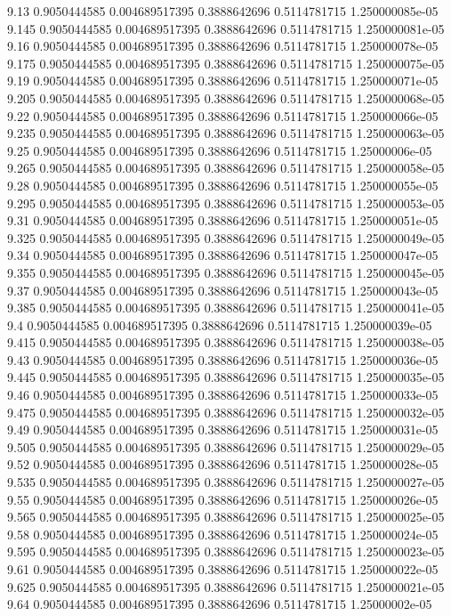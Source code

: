 {9.13 0.9050444585 0.004689517395 0.3888642696 0.5114781715 1.250000085e-05
9.145 0.9050444585 0.004689517395 0.3888642696 0.5114781715 1.250000081e-05
9.16 0.9050444585 0.004689517395 0.3888642696 0.5114781715 1.250000078e-05
9.175 0.9050444585 0.004689517395 0.3888642696 0.5114781715 1.250000075e-05
9.19 0.9050444585 0.004689517395 0.3888642696 0.5114781715 1.250000071e-05
9.205 0.9050444585 0.004689517395 0.3888642696 0.5114781715 1.250000068e-05
9.22 0.9050444585 0.004689517395 0.3888642696 0.5114781715 1.250000066e-05
9.235 0.9050444585 0.004689517395 0.3888642696 0.5114781715 1.250000063e-05
9.25 0.9050444585 0.004689517395 0.3888642696 0.5114781715 1.25000006e-05
9.265 0.9050444585 0.004689517395 0.3888642696 0.5114781715 1.250000058e-05
9.28 0.9050444585 0.004689517395 0.3888642696 0.5114781715 1.250000055e-05
9.295 0.9050444585 0.004689517395 0.3888642696 0.5114781715 1.250000053e-05
9.31 0.9050444585 0.004689517395 0.3888642696 0.5114781715 1.250000051e-05
9.325 0.9050444585 0.004689517395 0.3888642696 0.5114781715 1.250000049e-05
9.34 0.9050444585 0.004689517395 0.3888642696 0.5114781715 1.250000047e-05
9.355 0.9050444585 0.004689517395 0.3888642696 0.5114781715 1.250000045e-05
9.37 0.9050444585 0.004689517395 0.3888642696 0.5114781715 1.250000043e-05
9.385 0.9050444585 0.004689517395 0.3888642696 0.5114781715 1.250000041e-05
9.4 0.9050444585 0.004689517395 0.3888642696 0.5114781715 1.250000039e-05
9.415 0.9050444585 0.004689517395 0.3888642696 0.5114781715 1.250000038e-05
9.43 0.9050444585 0.004689517395 0.3888642696 0.5114781715 1.250000036e-05
9.445 0.9050444585 0.004689517395 0.3888642696 0.5114781715 1.250000035e-05
9.46 0.9050444585 0.004689517395 0.3888642696 0.5114781715 1.250000033e-05
9.475 0.9050444585 0.004689517395 0.3888642696 0.5114781715 1.250000032e-05
9.49 0.9050444585 0.004689517395 0.3888642696 0.5114781715 1.250000031e-05
9.505 0.9050444585 0.004689517395 0.3888642696 0.5114781715 1.250000029e-05
9.52 0.9050444585 0.004689517395 0.3888642696 0.5114781715 1.250000028e-05
9.535 0.9050444585 0.004689517395 0.3888642696 0.5114781715 1.250000027e-05
9.55 0.9050444585 0.004689517395 0.3888642696 0.5114781715 1.250000026e-05
9.565 0.9050444585 0.004689517395 0.3888642696 0.5114781715 1.250000025e-05
9.58 0.9050444585 0.004689517395 0.3888642696 0.5114781715 1.250000024e-05
9.595 0.9050444585 0.004689517395 0.3888642696 0.5114781715 1.250000023e-05
9.61 0.9050444585 0.004689517395 0.3888642696 0.5114781715 1.250000022e-05
9.625 0.9050444585 0.004689517395 0.3888642696 0.5114781715 1.250000021e-05
9.64 0.9050444585 0.004689517395 0.3888642696 0.5114781715 1.25000002e-05
}
